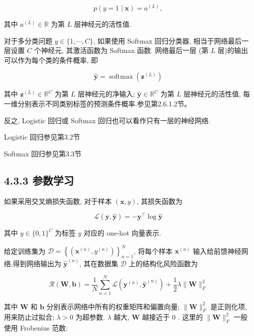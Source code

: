 \documentclass[10pt]{article}
\begin{document}
\begin{equation*}
p(y=1 \mid \boldsymbol{x})=a^{(L)}, \tag{4.40}
\end{equation*}


其中 $a^{(L)} \in \mathbb{R}$ 为第 $L$ 层神经元的活性值.

对于多分类问题 $y \in\{1, \cdots, C\}$, 如果使用 Softmax 回归分类器, 相当于网络最后一层设置 $C$ 个神经元, 其激活函数为 Softmax 函数. 网络最后一层 (第 $L$ 层)的输出可以作为每个类的条件概率, 即


\begin{equation*}
\hat{\boldsymbol{y}}=\operatorname{softmax}\left(\boldsymbol{z}^{(L)}\right) \tag{4.41}
\end{equation*}


其中 $\boldsymbol{z}^{(L)} \in \mathbb{R}^{C}$ 为第 $L$ 层神经元的净输入; $\hat{\boldsymbol{y}} \in \mathbb{R}^{C}$ 为第 $L$ 层神经元的活性值, 每一维分别表示不同类别标签的预测条件概率.参见第2.6.1.2节。

反之, Logistic 回归或 Softmax 回归也可以看作只有一层的神经网络.

Logistic 回归参见第3.2节

Softmax 回归参见第3.3节

\subsection*{4.3.3 参数学习}
如果采用交叉熵损失函数, 对于样本 $(\boldsymbol{x}, y)$, 其损失函数为


\begin{equation*}
\mathcal{L}(\boldsymbol{y}, \hat{\boldsymbol{y}})=-\boldsymbol{y}^{\top} \log \hat{\boldsymbol{y}} \tag{4.42}
\end{equation*}


其中 $y \in\{0,1\}^{C}$ 为标签 $y$ 对应的 one-hot 向量表示.

给定训练集为 $\mathcal{D}=\left\{\left(\boldsymbol{x}^{(n)}, y^{(n)}\right)\right\}_{n=1}^{N}$, 将每个样本 $\boldsymbol{x}^{(n)}$ 输入给前馈神经网络,得到网络输出为 $\hat{\boldsymbol{y}}^{(n)}$, 其在数据集 $\mathcal{D}$ 上的结构化风险函数为


\begin{equation*}
\mathcal{R}(\boldsymbol{W}, \boldsymbol{b})=\frac{1}{N} \sum_{n=1}^{N} \mathcal{L}\left(\boldsymbol{y}^{(n)}, \hat{\boldsymbol{y}}^{(n)}\right)+\frac{1}{2} \lambda\|\boldsymbol{W}\|_{F}^{2} \tag{4.43}
\end{equation*}


其中 $\boldsymbol{W}$ 和 $\boldsymbol{b}$ 分别表示网络中所有的权重矩阵和偏置向量; $\|\boldsymbol{W}\|_{F}^{2}$ 是正则化项, 用来防止过拟合; $\lambda>0$ 为超参数. $\lambda$ 越大, $\boldsymbol{W}$ 越接近于 0 . 这里的 $\|\boldsymbol{W}\|_{F}^{2}$ 一般使用 Frobenius 范数:
\end{document}
